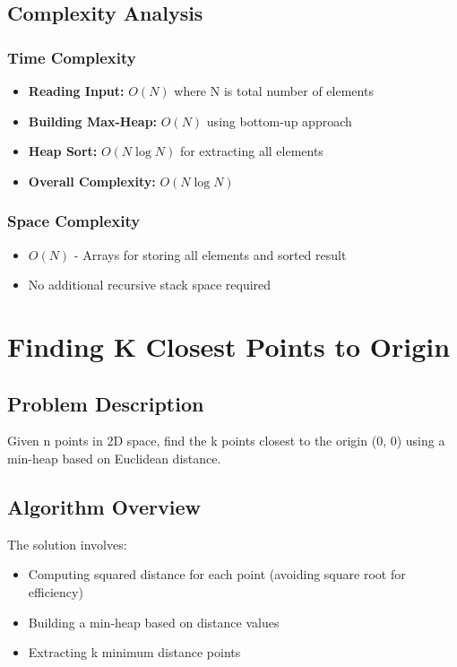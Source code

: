 \documentclass[12pt]{article}
\begin{document}
\subsection{Complexity Analysis}
\subsubsection{Time Complexity}
\begin{itemize}
    \item \textbf{Reading Input:} $O(N)$ where N is total number of elements
    \item \textbf{Building Max-Heap:} $O(N)$ using bottom-up approach
    \item \textbf{Heap Sort:} $O(N \log N)$ for extracting all elements
    \item \textbf{Overall Complexity:} $O(N \log N)$
\end{itemize}

\subsubsection{Space Complexity}
\begin{itemize}
    \item $O(N)$ - Arrays for storing all elements and sorted result
    \item No additional recursive stack space required
\end{itemize}

\section{Finding K Closest Points to Origin}
\subsection{Problem Description}
Given n points in 2D space, find the k points closest to the origin (0, 0) using a min-heap based on Euclidean distance.

\subsection{Algorithm Overview}
The solution involves:
\begin{itemize}
    \item Computing squared distance for each point (avoiding square root for efficiency)
    \item Building a min-heap based on distance values
    \item Extracting k minimum distance points
\end{itemize}
\end{document}
